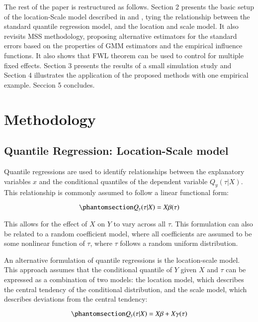 \documentclass[
  authoryear,
  review,
  1p]{elsarticle}
\begin{document}
The rest of the paper is restructured as follows. Section 2 presents the
basic setup of the location-Scale model described in \citet{he1997} and
\citet{zhao2000}, tying the relationship between the standard quantile
regression model, and the location and scale model. It also revisits MSS
methodology, proposing alternative estimators for the standard errors
based on the properties of GMM estimators and the empirical influence
functions. It also shows that FWL theorem can be used to control for
multiple fixed effects. Section 3 presents the results of a small
simulation study and Section 4 illustrates the application of the
proposed methods with one empirical example. Seccion 5 concludes.

\section{Methodology}\label{sec-method}

\subsection{Quantile Regression: Location-Scale model}\label{sec-betas}

Quantile regressions are used to identify relationships between the
explanatory variables \(x\) and the conditional quantiles of the
dependent variable \(Q_y(\tau|X)\). This relationship is commonly
assumed to follow a linear functional form:

\begin{equation}\phantomsection\label{eq-eq1}{Q_y(\tau|X) =X\beta(\tau)
}\end{equation}

This allows for the effect of \(X\) on \(Y\) to vary across all
\(\tau\). This formulation can also be related to a random coefficient
model, where all coefficients are assumed to be some nonlinear function
of \(\tau\), where \(\tau\) follows a random uniform distribution.

An alternative formulation of quantile regressions is the location-scale
model. This approach assumes that the conditional quantile of \(Y\)
given \(X\) and \(\tau\) can be expressed as a combination of two
models: the location model, which describes the central tendency of the
conditional distribution, and the scale model, which describes
deviations from the central tendency:

\begin{equation}\phantomsection\label{eq-eq2}{Q_y(\tau|X) =X\beta+X\gamma(\tau)
}\end{equation}
\end{document}
